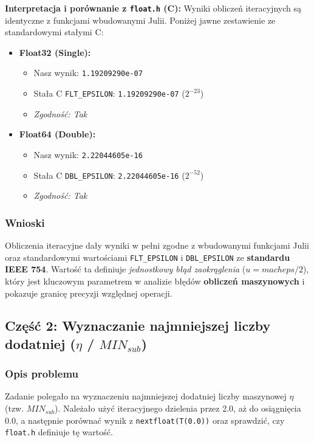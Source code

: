 \documentclass[12pt,a4paper]{article}
\begin{document}
\noindent \textbf{Interpretacja i porównanie z \texttt{float.h} (C):}
Wyniki obliczeń iteracyjnych są identyczne z funkcjami wbudowanymi Julii. Poniżej jawne zestawienie ze standardowymi stałymi C:

\begin{minipage}{\textwidth} %
\begin{itemize}
    \item \textbf{Float32 (Single):}
    \begin{itemize}
        \item Nasz wynik: \texttt{1.19209290e-07}
        \item Stała C \texttt{FLT\_EPSILON}: \texttt{1.19209290e-07} ($2^{-23}$)
        \item \textit{Zgodność: Tak}
    \end{itemize}
    \item \textbf{Float64 (Double):}
    \begin{itemize}
        \item Nasz wynik: \texttt{2.22044605e-16}
        \item Stała C \texttt{DBL\_EPSILON}: \texttt{2.22044605e-16} ($2^{-52}$)
        \item \textit{Zgodność: Tak}
    \end{itemize}
\end{itemize}
\end{minipage} %

\subsubsection{Wnioski}
Obliczenia iteracyjne dały wyniki w pełni zgodne z wbudowanymi funkcjami Julii oraz standardowymi wartościami \texttt{FLT\_EPSILON} i \texttt{DBL\_EPSILON} ze \textbf{standardu IEEE 754}. Wartość ta definiuje \textit{jednostkowy błąd zaokrąglenia} ($u = macheps / 2$), który jest kluczowym parametrem w analizie błędów \textbf{obliczeń maszynowych} i pokazuje granicę precyzji względnej operacji.

\subsection{Część 2: Wyznaczanie najmniejszej liczby dodatniej ($\eta$ / $MIN_{sub}$)}

\subsubsection{Opis problemu}
Zadanie polegało na wyznaczeniu najmniejszej dodatniej liczby maszynowej $\eta$ (tzw. $MIN_{sub}$). Należało użyć iteracyjnego dzielenia przez 2.0, aż do osiągnięcia 0.0, a następnie porównać wynik z \texttt{nextfloat(T(0.0))} oraz sprawdzić, czy \texttt{float.h} definiuje tę wartość.
\end{document}
